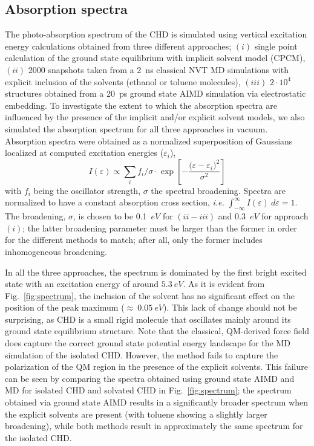 \documentclass[journal=jctcce,manuscript=article,layout=traditional]{achemso}
\newcommand{\fig}[1]{Fig.~\ref{#1}}
\begin{document}
\subsection{Absorption spectra}\label{sec:spectrum}
The photo-absorption spectrum of the CHD is simulated using vertical excitation energy calculations obtained from three different approaches; $(i)$ single point calculation of the ground state equilibrium with implicit solvent model (CPCM), $(ii)$ 2000 snapshots taken from a 2~ns classical NVT MD simulations with explicit inclusion of the solvents (ethanol or toluene molecules), $(iii)$ $2\cdot10^4$ structures obtained from a 20~ps ground state AIMD simulation via electrostatic embedding. To investigate the extent to which the absorption spectra are influenced by the presence of the implicit and/or explicit solvent models, we also simulated the absorption spectrum for all three approaches in vacuum. Absorption spectra were obtained as a normalized superposition of Gaussians localized at computed excitation energies ($\varepsilon_i$),
\begin{equation}
  \label{eqn:spectrum}
  I(\varepsilon) \propto \sum_{i} f_i / \sigma \cdot \exp \left[-\dfrac{(\varepsilon - {\varepsilon_i)^2}}{\sigma^2} \right]
\end{equation}
%
with $f_i$ being the oscillator strength, $\sigma$ the spectral broadening. %
Spectra are normalized to have a constant absorption cross section, \emph{i.e.} $\int_{-\infty}^{\infty}  I(\varepsilon)~d\varepsilon = 1$. The broadening, $\sigma$, is chosen to be  0.1~$eV$ for $(ii-iii)$ and 0.3~$eV$ for approach $(i)$; the latter broadening parameter must be larger than the former in order for the different methods to match; after all, only the former includes inhomogeneous broadening.  
%

In all the three approaches, the spectrum is dominated by the first bright excited state with an excitation energy of around $5.3~eV$. As it is evident from \fig{fig:spectrum}, the inclusion of the solvent has no significant effect on the position of the peak maximum ($\approx~0.05~eV$). This lack of change should not be surprising, as CHD is a small rigid molecule that oscillates mainly around its ground state equilibrium structure. Note that the classical, QM-derived force field does capture the correct ground state potential energy landscape for the MD simulation of the isolated CHD. However, the method fails to capture the polarization of the QM region in the presence of the explicit solvents. This failure can be seen by comparing the spectra obtained using ground state AIMD and MD for isolated CHD and solvated CHD in \fig{fig:spectrum}; the spectrum obtained via ground state AIMD results in a significantly broader spectrum when the explicit solvents are present (with toluene showing a slightly larger broadening), while both methods result in approximately the same spectrum for the isolated CHD. 
\end{document}
